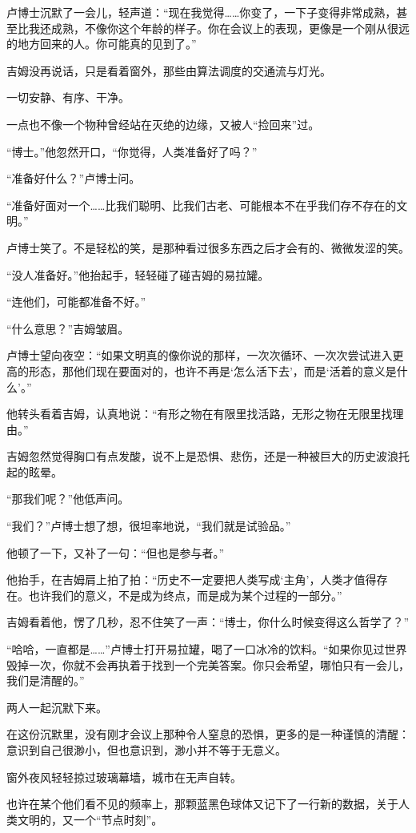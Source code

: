 卢博士沉默了一会儿，轻声道：“现在我觉得……你变了，一下子变得非常成熟，甚至比我还成熟，不像你这个年龄的样子。你在会议上的表现，更像是一个刚从很远的地方回来的人。你可能真的见到了。”

吉姆没再说话，只是看着窗外，那些由算法调度的交通流与灯光。

一切安静、有序、干净。

一点也不像一个物种曾经站在灭绝的边缘，又被人“捡回来”过。

“博士。”他忽然开口，“你觉得，人类准备好了吗？”

“准备好什么？”卢博士问。

“准备好面对一个……比我们聪明、比我们古老、可能根本不在乎我们存不存在的文明。”

卢博士笑了。不是轻松的笑，是那种看过很多东西之后才会有的、微微发涩的笑。

“没人准备好。”他抬起手，轻轻碰了碰吉姆的易拉罐。

“连他们，可能都准备不好。”

“什么意思？”吉姆皱眉。

卢博士望向夜空：“如果文明真的像你说的那样，一次次循环、一次次尝试进入更高的形态，那他们现在要面对的，也许不再是‘怎么活下去’，而是‘活着的意义是什么’。”

他转头看着吉姆，认真地说：“有形之物在有限里找活路，无形之物在无限里找理由。”

吉姆忽然觉得胸口有点发酸，说不上是恐惧、悲伤，还是一种被巨大的历史波浪托起的眩晕。

“那我们呢？”他低声问。

“我们？”卢博士想了想，很坦率地说，“我们就是试验品。”

他顿了一下，又补了一句：“但也是参与者。”

他抬手，在吉姆肩上拍了拍：“历史不一定要把人类写成‘主角’，人类才值得存在。也许我们的意义，不是成为终点，而是成为某个过程的一部分。”

吉姆看着他，愣了几秒，忍不住笑了一声：“博士，你什么时候变得这么哲学了？”

“哈哈，一直都是……”卢博士打开易拉罐，喝了一口冰冷的饮料。“如果你见过世界毁掉一次，你就不会再执着于找到一个完美答案。你只会希望，哪怕只有一会儿，我们是清醒的。”

两人一起沉默下来。

在这份沉默里，没有刚才会议上那种令人窒息的恐惧，更多的是一种谨慎的清醒：意识到自己很渺小，但也意识到，渺小并不等于无意义。

窗外夜风轻轻掠过玻璃幕墙，城市在无声自转。

也许在某个他们看不见的频率上，那颗蓝黑色球体又记下了一行新的数据，关于人类文明的，又一个“节点时刻”。

